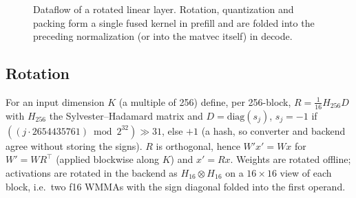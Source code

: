 \documentclass[10.5pt,a4paper]{article}
\begin{document}
\begin{figure}[H]
\centering
{}
\caption{Dataflow of a rotated linear layer. Rotation, quantization and packing form a single fused kernel in prefill and are folded into the preceding normalization (or into the matvec itself) in decode.}
\end{figure}

\subsection{Rotation}
For an input dimension $K$ (a multiple of 256) define, per 256-block, $R=\tfrac1{16}H_{256}D$ with $H_{256}$ the Sylvester--Hadamard matrix and $D=\mathrm{diag}(s_j)$,
$s_j=-1$ if $((j\cdot2654435761)\bmod2^{32})\gg31$, else $+1$ (a hash, so converter and backend agree without storing the signs). $R$ is orthogonal, hence $W'x'=Wx$ for
$W'=WR^{\top}$ (applied blockwise along $K$) and $x'=Rx$. Weights are rotated offline; activations are rotated in the backend as $H_{16}\otimes H_{16}$ on a $16\times16$ view of each block,
i.e.\ two f16 WMMAs with the sign diagonal folded into the first operand.
\end{document}
